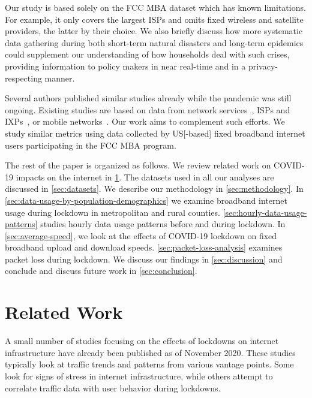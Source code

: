 \documentclass[conference,10pt]{IEEEtran}
\begin{document}
Our study is based solely on the \gls{FCC} \gls{MBA} dataset which has known limitations. For example, it only covers the largest \glspl{ISP} and omits fixed wireless and satellite providers, the latter by their choice. We also briefly discuss how more systematic data gathering during both short-term natural disasters and long-term epidemics could supplement our understanding of how households deal with such crises, providing information to policy makers in near real-time and in a privacy-respecting manner.

Several authors published similar studies already while the pandemic was still ongoing. Existing studies are based on data from network services~\cite{bottger2020internet,akamai,facebook}, \glspl{ISP} and \glspl{IXP}~\cite{feldmann2020lockdown,liu2020characterizing}, or mobile networks~\cite{lutu2020characterization}. Our work aims to complement such efforts. We study similar metrics using data collected by \gls{US}[-based] fixed broadband internet users participating in the \gls{FCC} \gls{MBA} program.

The rest of the paper is organized as follows. We review related work on COVID-19 impacts on the internet in \cref{sec:related-work}. The datasets used in all our analyses are discussed in \cref{sec:datasets}. We describe our methodology in \cref{sec:methodology}. In \cref{sec:data-usage-by-population-demographics} we examine broadband internet usage during lockdown in metropolitan and rural counties. \cref{sec:hourly-data-usage-patterns} studies hourly data usage patterns before and during lockdown. In \cref{sec:average-speed}, we look at the effects of COVID-19 lockdown on fixed broadband upload and download speeds. \cref{sec:packet-loss-analysis} examines packet loss during lockdown. We discuss our findings in \cref{sec:discussion} and conclude and discuss future work in \cref{sec:conclusion}.

\section{Related Work}\label{sec:related-work}



A small number of studies focusing on the effects of lockdowns on internet infrastructure have already been published as of November 2020. These studies typically look at traffic trends and patterns from various vantage points. Some look for signs of stress in internet infrastructure, while others attempt to correlate traffic data with user behavior during lockdowns.
\end{document}
